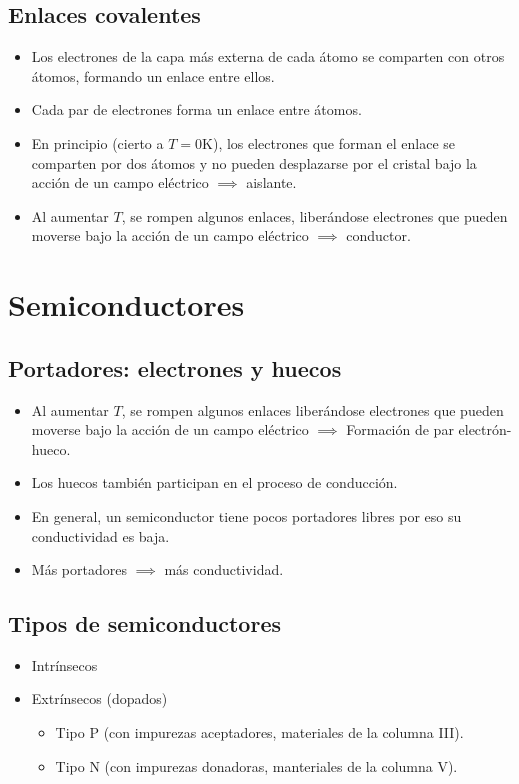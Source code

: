\documentclass[10pt,a4paper]{article}
\begin{document}
	\subsection{Enlaces covalentes}
	\begin{itemize}
		\item Los electrones de la capa más externa de cada átomo se comparten con otros átomos, formando un enlace entre ellos.
		\item Cada par de electrones forma un enlace entre átomos.
		\item En principio (cierto a $T = 0$K), los electrones que forman el enlace se comparten por dos átomos y no pueden desplazarse por el cristal bajo la acción de un campo eléctrico $\implies$ aislante.
		\item Al aumentar $T$, se rompen algunos enlaces, liberándose electrones que pueden moverse bajo la acción de un campo eléctrico $\implies$ conductor.
	\end{itemize}
	
	\section{Semiconductores}
	
	\subsection{Portadores: electrones y huecos}
	\begin{itemize}
		\item Al aumentar $T$, se rompen algunos enlaces liberándose electrones que pueden moverse bajo la acción de un campo eléctrico $\implies$ Formación de par electrón-hueco.
		\item Los huecos también participan en el proceso de conducción.
		\item En general, un semiconductor tiene pocos portadores libres por eso su conductividad es baja.
		\item Más portadores $\implies$ más conductividad.
	\end{itemize}
	
	\subsection{Tipos de semiconductores}
	\begin{itemize}
		\item Intrínsecos
		\item Extrínsecos (dopados)
		\begin{itemize}
			\item Tipo P (con impurezas aceptadores, materiales de la columna III).
			\item Tipo N (con impurezas donadoras, manteriales de la columna V).
		\end{itemize}
	\end{itemize}
\end{document}
